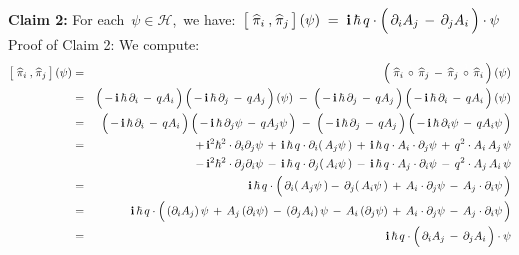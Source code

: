 \vskip 0.3cm
\noindent
\textbf{Claim 2:}\;
For each \,$\psi \in \mathcal{H}$,\, we have:
\,$
\left[\;
    \widehat{\pi}_{i}
    \, \overset{{\color{white}1}}{,} \,
    \widehat{\pi}_{j}
    \,\right](\psi)
\; = \;
    \i\,\hbar\,q\cdot\left(\,
        \partial_{i}A_{j}
        \,\overset{{\color{white}.}}{-}\,
        \partial_{j}A_{i}
        \,\right)
    \cdot
    \psi
$\,
\vskip 0.1cm
\noindent
Proof of Claim 2:\; We compute:
\begin{eqnarray*}
\left[\;
    \widehat{\pi}_{i}
    \, \overset{{\color{white}1}}{,} \,
    \widehat{\pi}_{j}
    \,\right](\psi)
& = &
    \left(\;
        \widehat{\pi}_{i}
        \, \overset{{\color{white}1}}{\circ} \,
        \widehat{\pi}_{j}
        \, - \,
        \widehat{\pi}_{j}
        \, \overset{{\color{white}1}}{\circ} \,
        \widehat{\pi}_{i}
        \,\right)(\psi)
\\
& = &
    \left(\,-\,\i\,\hbar\,\partial_{i}\,\overset{{\color{white}.}}{-}\,q A_{i}\,\right)
    \left(\,-\,\i\,\hbar\,\partial_{j}\,\overset{{\color{white}.}}{-}\,q A_{j}\,\right)
    (\psi)
    \; - \;
    \left(\,-\,\i\,\hbar\,\partial_{j}\,\overset{{\color{white}.}}{-}\,q A_{j}\,\right)
    \left(\,-\,\i\,\hbar\,\partial_{i}\,\overset{{\color{white}.}}{-}\,q A_{i}\,\right)
    (\psi)
\\
& = &
    \left(\,-\,\i\,\hbar\,\partial_{i}\,\overset{{\color{white}.}}{-}\,q A_{i}\,\right)
    \left(\,-\,\i\,\hbar\,\partial_{j}\psi\,\overset{{\color{white}.}}{-}\,q A_{j}\psi\,\right)
    \; - \;
    \left(\,-\,\i\,\hbar\,\partial_{j}\,\overset{{\color{white}.}}{-}\,q A_{j}\,\right)
    \left(\,-\,\i\,\hbar\,\partial_{i}\psi\,\overset{{\color{white}.}}{-}\,q A_{i}\psi\,\right)
\\
& = &
    +\,\i^{2}\hbar^{2}\cdot\partial_{i}\partial_{j}\psi
    \,+\,
    \i\,\hbar\,q\cdot\partial_{i}\!\left(\,A_{j}\psi\,\right)
    \,+\,
    \i\,\hbar\,q\cdot A_{i} \cdot \partial_{j}\psi
    \,+\,
    q^{2}\cdot A_{i}\,A_{j}\,\psi
\\
&&
    -\,\i^{2}\hbar^{2}\cdot\partial_{j}\partial_{i}\psi
    \,-\,
    \i\,\hbar\,q\cdot\partial_{j}\!\left(\,A_{i}\psi\,\right)
    \,-\,
    \i\,\hbar\,q\cdot A_{j} \cdot \partial_{i}\psi
    \,-\,
    q^{2}\cdot A_{j}\,A_{i}\,\psi
\\
& = &
    \i\,\hbar\,q\cdot\left(\,
        \partial_{i}\!\left(\,A_{j}\psi\,\right)
        \overset{{\color{white}.}}{-}\,
        \partial_{j}\!\left(\,A_{i}\psi\,\right)
        \,+\,
        A_{i} \cdot \partial_{j}\psi
        \,-\,
        A_{j} \cdot \partial_{i}\psi
        \,\right)
\\
& = &
    \i\,\hbar\,q\cdot\left(\,
        \left(\partial_{i}A_{j}\right)\psi
        \,\overset{{\color{white}.}}{+}\,
        A_{j}\left(\partial_{i}\psi\right)
        \,-\,
        \left(\partial_{j}A_{i}\right)\psi
        \,-\,
        A_{i}\left(\partial_{j}\psi\right)
        \,+\,
        A_{i} \cdot \partial_{j}\psi
        \,-\,
        A_{j} \cdot \partial_{i}\psi
        \,\right)
\\
& = &
    \i\,\hbar\,q\cdot\left(\,
        \partial_{i}A_{j}
        \,\overset{{\color{white}.}}{-}\,
        \partial_{j}A_{i}
        \,\right)
    \cdot
    \psi
\end{eqnarray*}
